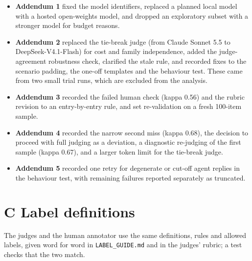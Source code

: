 \documentclass[fleqn,10pt]{wlscirep}
\begin{document}
\begin{itemize}
\item \textbf{Addendum 1} fixed the model identifiers, replaced a planned local model with a hosted open-weights model, and dropped an exploratory subset with a stronger model for budget reasons.
\item \textbf{Addendum 2} replaced the tie-break judge (from Claude Sonnet 5.5 to DeepSeek-V4.1-Flash) for cost and family independence, added the judge-agreement robustness check, clarified the stale rule, and recorded fixes to the scenario padding, the one-off templates and the behaviour test. These came from two small trial runs, which are excluded from the analysis.
\item \textbf{Addendum 3} recorded the failed human check (kappa 0.56) and the rubric revision to an entry-by-entry rule, and set re-validation on a fresh 100-item sample.
\item \textbf{Addendum 4} recorded the narrow second miss (kappa 0.68), the decision to proceed with full judging as a deviation, a diagnostic re-judging of the first sample (kappa 0.67), and a larger token limit for the tie-break judge.
\item \textbf{Addendum 5} recorded one retry for degenerate or cut-off agent replies in the behaviour test, with remaining failures reported separately as truncated.
\end{itemize}

\section*{C Label definitions}

\begin{sloppypar}
The judges and the human annotator use the same definitions, rules and allowed labels, given word for word in \texttt{LABEL\_GUIDE.md} and in the judges' rubric; a test checks that the two match.
\end{sloppypar}
\end{document}

